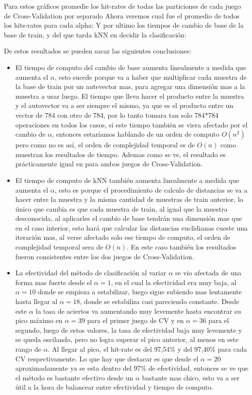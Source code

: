 \documentclass[a4paper]{article}
\begin{document}
Para estos gráficos promedie los hit-rates de todas las particiones de cada juego de Cross-Validation por separado
Ahora veremos cual fue el promedio de todos los hits-rates para cada alpha:
\smallbreak
Y por ultimo los tiempos de cambio de base de la base de train, y del que tarda kNN en decidir la clasificación:
\smallbreak
\par
De estos resultados se pueden sacar las siguientes conclusiones:
\begin{itemize}
\item El tiempo de computo del cambio de base aumenta linealmente a medida que aumenta el $\alpha$, esto sucede porque va a haber que multiplicar cada muestra de la base de train por un autevector mas, para agregar una dimensión mas a la muestra a usar luego. El tiempo que lleva hacer el producto entre la muestra y el autovector va a ser siempre el mismo, ya que es el producto entre un vector de 784 con otro de 784, por lo tanto tomara tan solo 784*784 operaciones en todos los casos, si este tiempo también se viera afectado por el cambio de $\alpha$, entonces estaríamos hablando de un orden de computo $O(n^2)$ pero como no es así, el orden de complejidad temporal es de $O(n)$ como muestran los resultados de tiempo. Ademas como se ve, el resultado es prácticamente igual en para ambos juegos de Cross-Validation.
\item El tiempo de computo de kNN también aumenta linealmente a medida que aumenta el $\alpha$, esto es porque el procedimiento de calculo de distancias se va a hacer entre la muestra y la misma cantidad de muestras de train anterior, lo único que cambia es que cada muestra de train, al igual que la muestra desconocida, al aplicarles el cambio de base tendrán una dimensión mas que en el caso interior, esto hará que calcular las distancias euclidianas cueste una iteración mas, al verse afectado solo ese tiempo de computo, el orden de complejidad temporal sera de $O(n)$. En este caso también los resultados fueron consistentes entre los dos juegos de Cross-Validation.
\item La efectividad del método de clasificación al variar $\alpha$ se vio afectada de una forma mas fuerte desde el $\alpha = 1$, en el cual la efectividad era muy baja, al $\alpha = 10$ donde se empieza a estabilizar, luego sigue subiendo mas lentamente hasta llegar al $\alpha = 18$, donde se estabiliza casi pareciendo constante. Desde este $\alpha$ la tasa de aciertos va aumentando muy levemente hasta encontrar su pico máximo en $\alpha = 39$ para el primer juego de CV y en $\alpha = 36$ para el segundo, luego de estos valores, la tasa de efectividad baja muy levemente y se queda oscilando, pero no logra superar el pico anterior, al menos en este rango de $\alpha$. Al llegar al pico, el hit-rate es del 97,54\% y del 97,40\% para cada CV respectivamente. Lo que hay que destacar es que desde el $\alpha = 20$ aproximadamente ya se esta dentro del 97\% de efectividad, entonces se ve que el método es bastante efectivo desde un $\alpha$ bastante mas chico, esto va a ser útil a la hora de balancear entre efectividad y tiempo de computo.

\end{itemize}
\end{document}
